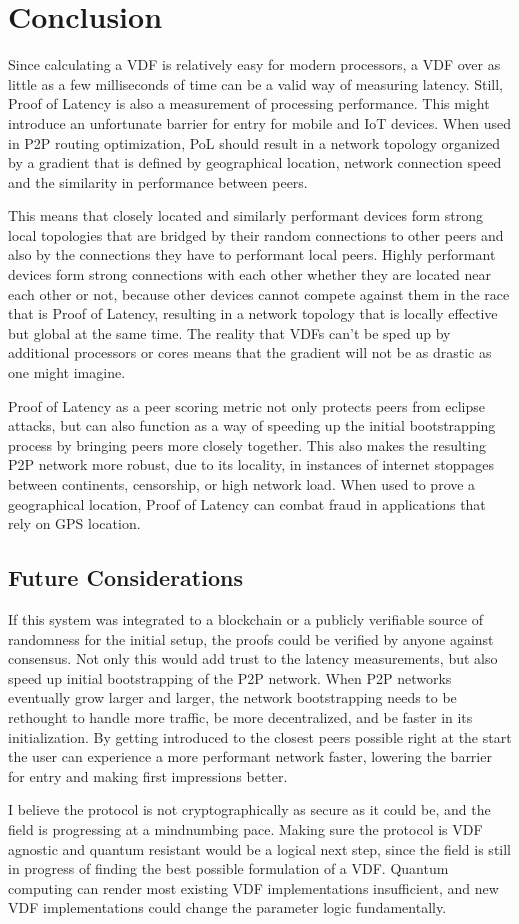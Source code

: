 \chapter{Conclusion}
\label{Conclusion}
Since calculating a VDF is relatively easy for modern processors, a VDF over as little as a few milliseconds of time can be a valid way of measuring latency. Still, Proof of Latency is also a measurement of processing performance. This might introduce an unfortunate barrier for entry for mobile and IoT devices. When used in P2P routing optimization, PoL should result in a network topology organized by a gradient that is defined by geographical location, network connection speed and the similarity in performance between peers.

This means that closely located and similarly performant devices form strong local topologies that are bridged by their random connections to other peers and also by the connections they have to performant local peers. Highly performant devices form strong connections with each other whether they are located near each other or not, because other devices cannot compete against them in the race that is Proof of Latency, resulting in a network topology that is locally effective but global at the same time. The reality that VDFs can't be sped up by additional processors or cores means that the gradient will not be as drastic as one might imagine.

Proof of Latency as a peer scoring metric not only protects peers from eclipse attacks, but can also function as a way of speeding up the initial bootstrapping process by bringing peers more closely together. This also makes the resulting P2P network more robust, due to its locality, in instances of internet stoppages between continents, censorship, or high network load. When used to prove a geographical location, Proof of Latency can combat fraud in applications that rely on GPS location.

\section{Future Considerations}
If this system was integrated to a blockchain or a publicly verifiable source of randomness for the initial setup, the proofs could be verified by anyone against consensus. Not only this would add trust to the latency measurements, but also speed up initial bootstrapping of the P2P network. When P2P networks eventually grow larger and larger, the network bootstrapping needs to be rethought to handle more traffic, be more decentralized, and be faster in its initialization. By getting introduced to the closest peers possible right at the start the user can experience a more performant network faster, lowering the barrier for entry and making first impressions better.

I believe the protocol is not cryptographically as secure as it could be, and the field is progressing at a mindnumbing pace. Making sure the protocol is VDF agnostic and quantum resistant would be a logical next step, since the field is still in progress of finding the best possible formulation of a VDF. Quantum computing can render most existing VDF implementations insufficient, and new VDF implementations could change the parameter logic fundamentally.

